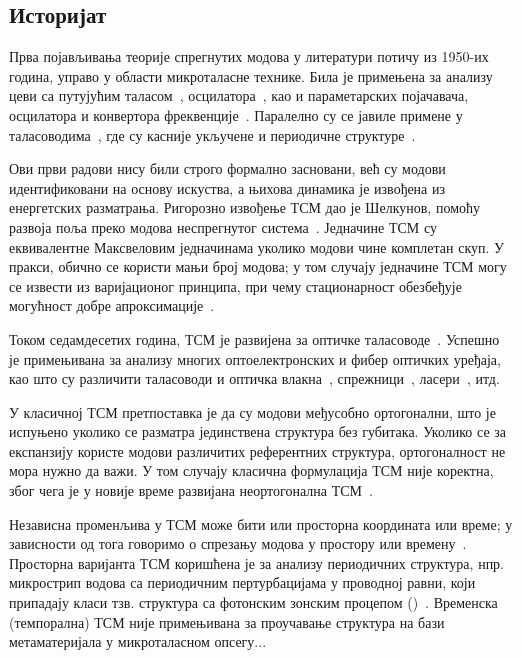 \documentclass[main.tex]{subfiles}
\begin{document}
\subsection{Историјат}
Прва појављивања теорије спрегнутих модова у литератури потичу из 1950-их година, управо у области микроталасне технике. Била је примењена за анализу цеви са путујућим таласом~\cite{pierce1954coupling},  осцилатора~\cite{1471949}, као и параметарских појачавача, осцилатора и конвертора фреквенције~\cite{louisell1960coupled}. Паралелно су се јавиле примене у таласоводима~\cite{1124830,louisell1955analysis}, где су касније укључене и периодичне структуре~\cite{tang1969mode}.

Ови први радови нису били строго формално засновани, већ су модови идентификовани на основу искуства, а њихова динамика је извођена из енергетских разматрања. Ригорозно извођење ТСМ дао је Шелкунов, помоћу развоја поља преко модова неспрегнутог система~\cite{6771476}. Једначине ТСМ су еквивалентне Максвеловим једначинама уколико модови чине комплетан скуп. У пракси, обично се користи мањи број модова; у том случају једначине ТСМ могу се извести из варијационог принципа, при чему стационарност обезбеђује могућност добре апроксимације~\cite{hausproc}.

Током седамдесетих година, ТСМ је развијена за оптичке таласоводе~\cite{6771781,snyder1972coupled,1077767}. Успешно је примењивана за анализу многих оптоелектронских и фибер оптичких уређаја, као што су различити таласоводи и оптичка влакна~\cite{taylor1973optical,mcintyre1973power}, спрежници~\cite{1069190}, ласери~\cite{butler1984coupled}, итд.

У класичној ТСМ претпоставка је да су модови међусобно ортогонални, што је испуњено уколико се разматра јединствена структура без губитака. Уколико се за експанзију користе модови различитих референтних структура, ортогоналност не мора нужно да важи. У том случају класична формулација ТСМ није коректна, због чега је у новије време развијана неортогонална ТСМ~\cite{haus1987coupled,wonjoo}.

Независна променљива у ТСМ може бити или просторна координата или време; у зависности од тога говоримо о спрезању модова у простору или времену~\cite{haus}. Просторна варијанта ТСМ коришћена је за анализу периодичних структура, нпр. микрострип водова са периодичним пертурбацијама у проводној равни, који припадају класи тзв. структура са фотонским зонским процепом ()~\cite{lopetegi_cmt}. Временска (темпорална) ТСМ није примењивана за проучавање структура на бази метаматеријала у микроталасном опсегу...
\end{document}
